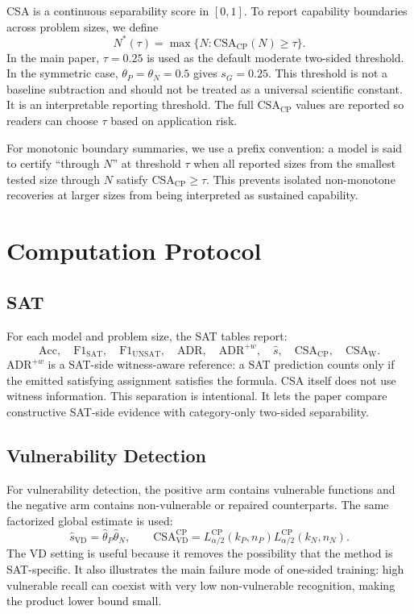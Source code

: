 \documentclass[10pt,conference]{IEEEtran}
\theoremstyle{remark}
\newcommand{\CSA}{\mathrm{CSA}}
\newcommand{\CSACP}{\mathrm{CSA}_{\mathrm{CP}}}
\newcommand{\CSAW}{\mathrm{CSA}_{\mathrm{W}}}
\begin{document}
CSA is a continuous separability score in $[0,1]$.  To report capability boundaries across problem sizes, we define
\[
N^*(\tau)=\max\{N:\CSACP(N)\ge \tau\}.
\]
In the main paper, $\tau=0.25$ is used as the default moderate two-sided threshold.  In the symmetric case, $\theta_P=\theta_N=0.5$ gives $s_G=0.25$.  This threshold is not a baseline subtraction and should not be treated as a universal scientific constant.  It is an interpretable reporting threshold.  The full $\CSACP$ values are reported so readers can choose $\tau$ based on application risk.

For monotonic boundary summaries, we use a prefix convention: a model is said to certify ``through $N$'' at threshold $\tau$ when all reported sizes from the smallest tested size through $N$ satisfy $\CSACP\ge\tau$.  This prevents isolated non-monotone recoveries at larger sizes from being interpreted as sustained capability.

\section{Computation Protocol}
\label{sec:supp-protocol}

\subsection{SAT}

For each model and problem size, the SAT tables report:
\[
\mathrm{Acc},\quad
\mathrm{F1}_{\mathrm{SAT}},\quad
\mathrm{F1}_{\mathrm{UNSAT}},\quad
\mathrm{ADR},\quad
\mathrm{ADR}^{+w},\quad
\hat{s},\quad
\CSACP,\quad
\CSAW.
\]
$\mathrm{ADR}^{+w}$ is a SAT-side witness-aware reference: a SAT prediction counts only if the emitted satisfying assignment satisfies the formula.  CSA itself does not use witness information.  This separation is intentional.  It lets the paper compare constructive SAT-side evidence with category-only two-sided separability.

\subsection{Vulnerability Detection}

For vulnerability detection, the positive arm contains vulnerable functions and the negative arm contains non-vulnerable or repaired counterparts.  The same factorized global estimate is used:
\[
\hat{s}_{\mathrm{VD}}=\hat\theta_P\hat\theta_N,
\qquad
\CSA^{\mathrm{CP}}_{\mathrm{VD}}=
L^{\mathrm{CP}}_{\alpha/2}(k_P,n_P)
L^{\mathrm{CP}}_{\alpha/2}(k_N,n_N).
\]
The VD setting is useful because it removes the possibility that the method is SAT-specific.  It also illustrates the main failure mode of one-sided training: high vulnerable recall can coexist with very low non-vulnerable recognition, making the product lower bound small.
\end{document}

